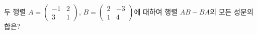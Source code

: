 두 행렬 $A=\begin{pmatrix} -1 & 2 \\ 3 & 1 \end{pmatrix}$, $B=\begin{pmatrix} 2 & -3 \\ 1 & 4 \end{pmatrix}$에 대하여 행렬 $AB-BA$의 모든 성분의 합은?
